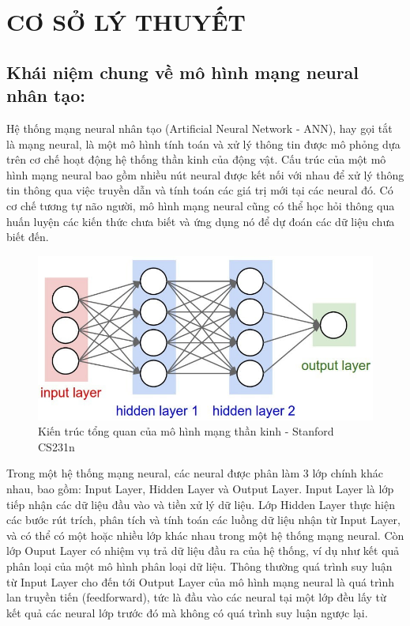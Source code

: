 \chapter{CƠ SỞ LÝ THUYẾT}
\section{Khái niệm chung về mô hình mạng neural nhân tạo:}
Hệ thống mạng neural nhân tạo (Artificial Neural Network - ANN), hay gọi tắt là mạng neural, là một mô hình tính toán và xử lý thông tin được mô phỏng dựa trên cơ chế hoạt động hệ thống thần kinh của động vật. Cấu trúc của một mô hình mạng neural bao gồm nhiều nút neural được kết nối với nhau để xử lý thông tin thông qua việc truyền dẫn và tính toán các giá trị mới tại các neural đó. Có cơ chế tương tự não người, mô hình mạng neural cũng có thể học hỏi thông qua huấn luyện các kiến thức chưa biết và ứng dụng nó để dự đoán các dữ liệu chưa biết đến.

\begin{figure}[htbp]
    \centering
    \includegraphics[width=12cm]{Images/ANN.jpg}
    \caption[Kiến trúc tổng quan của mô hình mạng thần kinh]
    {Kiến trúc tổng quan của mô hình mạng thần kinh - Stanford CS231n}
\end{figure}
\newpage
Trong một hệ thống mạng neural, các neural được phân làm 3 lớp chính khác nhau, bao gồm: Input Layer, Hidden Layer và Output Layer. Input Layer là lớp tiếp nhận các dữ liệu đầu vào và tiền xử lý dữ liệu. Lớp Hidden Layer thực hiện các bước rút trích, phân tích và tính toán các luồng dữ liệu nhận từ Input Layer, và có thể có một hoặc nhiều lớp khác nhau trong một hệ thống mạng neural. Còn lớp Ouput Layer có nhiệm vụ trả dữ liệu đầu ra của hệ thống, ví dụ như kết quả phân loại của một mô hình phân loại dữ liệu. Thông thường quá trình suy luận từ Input Layer cho đến tới Output Layer của mô hình mạng neural là quá trình lan truyền tiến (feedforward), tức là đầu vào các neural tại một lớp đều lấy từ kết quả các neural lớp trước đó mà không có quá trình suy luận ngược lại.

